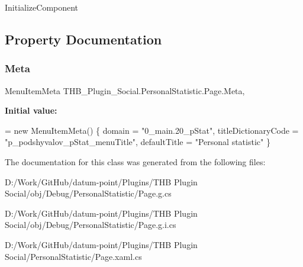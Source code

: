 Initialize\+Component 



\subsection{Property Documentation}
\mbox{\label{class_t_h_b___plugin___social_1_1_personal_statistic_1_1_page_ae70fce91bc8e4f2eb01caab193ce1491}} 
\subsubsection{\texorpdfstring{Meta}{Meta}}
{\footnotesize\ttfamily Menu\+Item\+Meta T\+H\+B\+\_\+\+Plugin\+\_\+\+Social.\+Personal\+Statistic.\+Page.\+Meta\hspace{0.3cm}{\ttfamily [get]}, {\ttfamily [set]}}

{\bfseries Initial value\+:}
\begin{DoxyCode}
= \textcolor{keyword}{new} MenuItemMeta()
        \{
            domain = \textcolor{stringliteral}{"0\_main.20\_pStat"},
            titleDictionaryCode = \textcolor{stringliteral}{"p\_podshyvalov\_pStat\_menuTitle"},
            defaultTitle = \textcolor{stringliteral}{"Personal statistic"}
        \}
\end{DoxyCode}


The documentation for this class was generated from the following files\+:\begin{DoxyCompactItemize}
\item 
D\+:/\+Work/\+Git\+Hub/datum-\/point/\+Plugins/\+T\+H\+B Plugin Social/obj/\+Debug/\+Personal\+Statistic/Page.\+g.\+cs\item 
D\+:/\+Work/\+Git\+Hub/datum-\/point/\+Plugins/\+T\+H\+B Plugin Social/obj/\+Debug/\+Personal\+Statistic/Page.\+g.\+i.\+cs\item 
D\+:/\+Work/\+Git\+Hub/datum-\/point/\+Plugins/\+T\+H\+B Plugin Social/\+Personal\+Statistic/Page.\+xaml.\+cs\end{DoxyCompactItemize}
